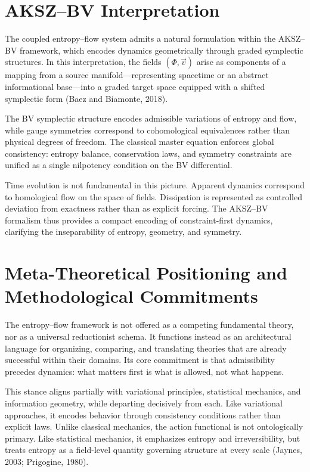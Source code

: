 \documentclass[11pt]{article}
\begin{document}
\section{AKSZ--BV Interpretation}

The coupled entropy–flow system admits a natural formulation within the AKSZ–BV framework, which encodes dynamics geometrically through graded symplectic structures. In this interpretation, the fields $(\Phi,\vec{v})$ arise as components of a mapping from a source manifold—representing spacetime or an abstract informational base—into a graded target space equipped with a shifted symplectic form (Baez and Biamonte, 2018).

The BV symplectic structure encodes admissible variations of entropy and flow, while gauge symmetries correspond to cohomological equivalences rather than physical degrees of freedom. The classical master equation enforces global consistency: entropy balance, conservation laws, and symmetry constraints are unified as a single nilpotency condition on the BV differential.

Time evolution is not fundamental in this picture. Apparent dynamics correspond to homological flow on the space of fields. Dissipation is represented as controlled deviation from exactness rather than as explicit forcing. The AKSZ–BV formalism thus provides a compact encoding of constraint-first dynamics, clarifying the inseparability of entropy, geometry, and symmetry.

\section{Meta-Theoretical Positioning and Methodological Commitments}

The entropy–flow framework is not offered as a competing fundamental theory, nor as a universal reductionist schema. It functions instead as an architectural language for organizing, comparing, and translating theories that are already successful within their domains. Its core commitment is that admissibility precedes dynamics: what matters first is what is allowed, not what happens.

This stance aligns partially with variational principles, statistical mechanics, and information geometry, while departing decisively from each. Like variational approaches, it encodes behavior through consistency conditions rather than explicit laws. Unlike classical mechanics, the action functional is not ontologically primary. Like statistical mechanics, it emphasizes entropy and irreversibility, but treats entropy as a field-level quantity governing structure at every scale (Jaynes, 2003; Prigogine, 1980).
\end{document}

